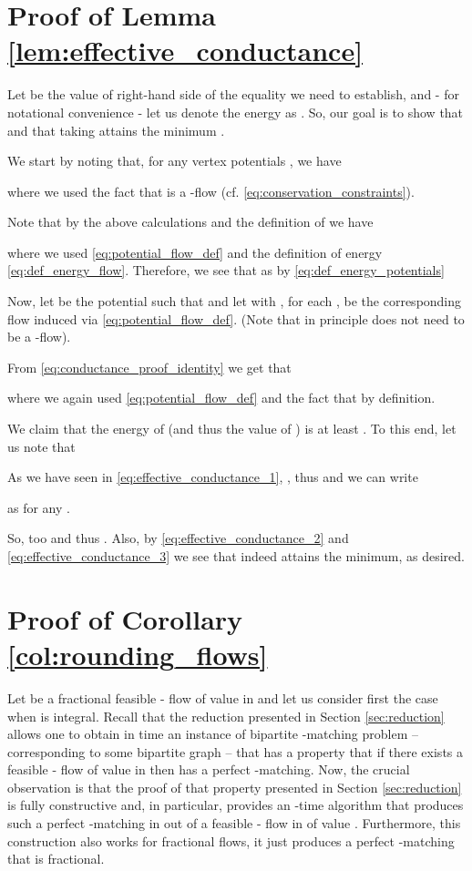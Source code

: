 \documentclass[11pt, letterpaper]{article}
\begin{document}
\section{Proof of Lemma \ref{lem:effective_conductance}}\label{app:effective_conductance}
Let  be the value of right-hand side of the equality we need to establish, and - for notational convenience - let us denote the energy  as . So, our goal is to show that  and that taking  attains the minimum .

We start by noting that, for any vertex potentials , we have

where we used the fact that  is a -flow (cf. \eqref{eq:conservation_constraints}).

Note that by the above calculations and the definition of  we have 

where we used \eqref{eq:potential_flow_def} and the definition of energy \eqref{eq:def_energy_flow}. Therefore, we see that  as by \eqref{eq:def_energy_potentials}



Now, let  be the potential such that  and let  with , for each , be the corresponding flow induced via \ref{eq:potential_flow_def}. (Note that in principle   does not need to be a -flow).

From \eqref{eq:conductance_proof_identity} we get that 

where we again used \eqref{eq:potential_flow_def} and the fact that  by definition.

We claim that the energy  of  (and thus the value of ) is at least . To this end, let us note that

As we have seen in \eqref{eq:effective_conductance_1}, , thus  and we can write

as  for any . 

So,  too and thus . Also, by \eqref{eq:effective_conductance_2} and \eqref{eq:effective_conductance_3} we see that  indeed attains the minimum, as desired.

\section{Proof of Corollary \ref{col:rounding_flows}}\label{app:col_rounding_flows}

Let  be a fractional feasible - flow of value  in  and let us consider first the case when  is integral. Recall that the reduction presented in Section \ref{sec:reduction} allows one to obtain in  time an instance of bipartite -matching problem -- corresponding to some bipartite graph  -- that has a property that if there exists a feasible - flow of value  in  then  has a perfect -matching. Now, the crucial observation is that the proof of that property presented in Section \ref{sec:reduction} is fully constructive and, in particular, provides an -time algorithm that produces such a perfect -matching in  out of a feasible - flow in  of value . Furthermore, this construction also works for fractional flows, it just produces a perfect -matching that is fractional. 
\end{document}

